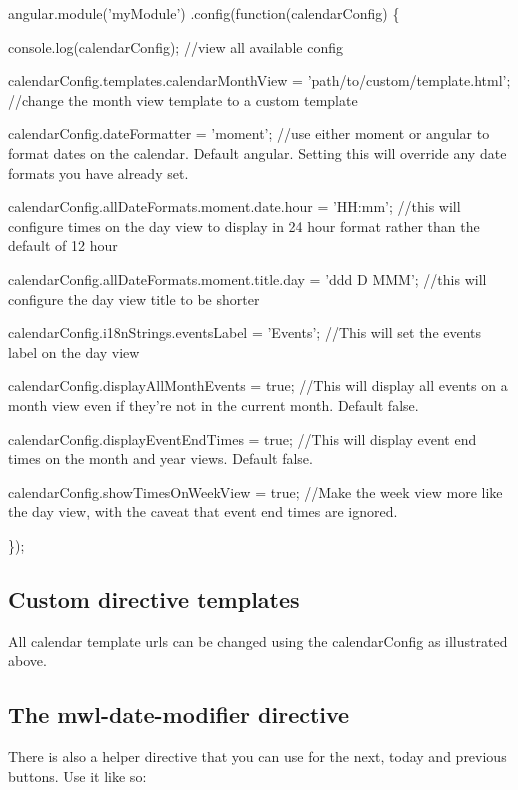 \begin{DoxyCode}
angular.module('myModule')
  .config(function(calendarConfig) \{

    console.log(calendarConfig); //view all available config

    calendarConfig.templates.calendarMonthView = 'path/to/custom/template.html'; //change the month view
       template to a custom template

    calendarConfig.dateFormatter = 'moment'; //use either moment or angular to format dates on the
       calendar. Default angular. Setting this will override any date formats you have already set.

    calendarConfig.allDateFormats.moment.date.hour = 'HH:mm'; //this will configure times on the day view
       to display in 24 hour format rather than the default of 12 hour

    calendarConfig.allDateFormats.moment.title.day = 'ddd D MMM'; //this will configure the day view title
       to be shorter

    calendarConfig.i18nStrings.eventsLabel = 'Events'; //This will set the events label on the day view

    calendarConfig.displayAllMonthEvents = true; //This will display all events on a month view even if
       they're not in the current month. Default false.

    calendarConfig.displayEventEndTimes = true; //This will display event end times on the month and year
       views. Default false.

    calendarConfig.showTimesOnWeekView = true; //Make the week view more like the day view, with the caveat
       that event end times are ignored.

  \});
\end{DoxyCode}


\subsection*{Custom directive templates}

All calendar template urls can be changed using the {\ttfamily calendar\+Config} as illustrated above.

\subsection*{The mwl-\/date-\/modifier directive}

There is also a helper directive that you can use for the next, today and previous buttons. Use it like so\+:


